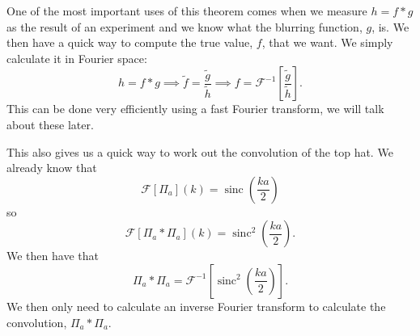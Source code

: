 \documentclass[a4paper]{article}
\newcommand{\FT}{\mathcal{F}}
\DeclareMathOperator{\sinc}{sinc}
\newcommand{\convolution}{\mathbin{*}}
\begin{document}
    One of the most important uses of this theorem comes when we measure \(h = f\convolution g\) as the result of an experiment and we know what the blurring function, \(g\), is.
    We then have a quick way to compute the true value, \(f\), that we want.
    We simply calculate it in Fourier space:
    \[h = f\convolution g \implies \tilde{f} = \frac{\tilde{g}}{\tilde{h}} \implies f = \FT^{-1}\left[\frac{\tilde{g}}{\tilde{h}}\right].\]
    This can be done very efficiently using a fast Fourier transform, we will talk about these later.
    
    This also gives us a quick way to work out the convolution of the top hat.
    We already know that
    \[\FT[\Pi_a](k) = \sinc\left(\frac{ka}{2}\right)\]
    so
    \[\FT[\Pi_a\convolution\Pi_a](k) = \sinc^2\left(\frac{ka}{2}\right).\]
    We then have that
    \[\Pi_a\convolution\Pi_a = \FT^{-1}\left[\sinc^2\left(\frac{ka}{2}\right)\right].\]
    We then only need to calculate an inverse Fourier transform to calculate the convolution, \(\Pi_a\convolution\Pi_a\).
    
\end{document}
